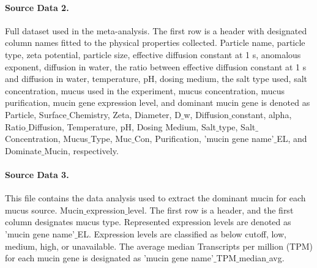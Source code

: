 \documentclass[a4paper]{article}
\begin{document}
\paragraph{Source Data 2.} Full dataset used in the meta-analysis. The first row is a header with designated column names fitted to the physical properties collected.  Particle name, particle type, zeta potential, particle size, effective diffusion constant at 1 s, anomalous exponent, diffusion in water, the ratio between effective diffusion constant at 1 s and diffusion in water, temperature, pH, dosing medium, the salt type used, salt concentration, mucus used in the experiment, mucus concentration, mucus purification, mucin gene expression level, and dominant mucin gene is denoted as Particle, Surface$\_$Chemistry,  Zeta,  Diameter, D$\_$w, Diffusion$\_$constant, alpha,  Ratio$\_$Diffusion, Temperature, pH, Dosing Medium, Salt$\_$type, Salt$\_$Concentration, Mucus$\_$Type, Muc$\_$Con, Purification, 'mucin gene name'$\_$EL, and Dominate$\_$Mucin, respectively.

\paragraph{Source Data 3.} This file contains the data analysis used to extract the dominant mucin for each mucus source. Mucin$\_$expression$\_$level. The first row is a header, and the first column designates mucus type. Represented expression levels are denoted as 'mucin gene name'$\_$EL. Expression levels are classified as below cutoff, 
low, medium, high, or unavailable. The average median Transcripts per million (TPM) for each mucin gene is designated as 'mucin gene name'$\_$TPM$\_$median$\_$avg.

\clearpage


\clearpage
\end{document}
